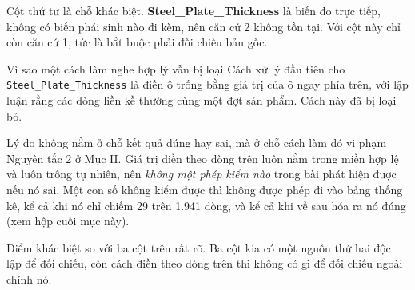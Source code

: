 \documentclass[12pt]{article}
\begin{document}
\noindent
Cột thứ tư là chỗ khác biệt. \textbf{Steel\_Plate\_Thickness} là biến đo trực tiếp, không có biến phái sinh nào đi kèm, nên căn cứ 2 không tồn tại. Với cột này chỉ còn căn cứ 1, tức là bắt buộc phải đối chiếu bản gốc.

\begin{guidelinebox}{Vì sao một cách làm nghe hợp lý vẫn bị loại}
Cách xử lý đầu tiên cho \texttt{Steel\_Plate\_Thickness} là điền ô trống bằng giá trị của ô ngay phía trên, với lập luận rằng các dòng liền kề thường cùng một đợt sản phẩm. Cách này đã bị loại bỏ.

Lý do không nằm ở chỗ kết quả đúng hay sai, mà ở chỗ cách làm đó vi phạm Nguyên tắc 2 ở Mục II. Giá trị điền theo dòng trên luôn nằm trong miền hợp lệ và luôn trông tự nhiên, nên \emph{không một phép kiểm nào} trong bài phát hiện được nếu nó sai. Một con số không kiểm được thì không được phép đi vào bảng thống kê, kể cả khi nó chỉ chiếm 29 trên 1.941 dòng, và kể cả khi về sau hóa ra nó đúng (xem hộp cuối mục này).

Điểm khác biệt so với ba cột trên rất rõ. Ba cột kia có một nguồn thứ hai độc lập để đối chiếu, còn cách điền theo dòng trên thì không có gì để đối chiếu ngoài chính nó.
\end{guidelinebox}
\end{document}
